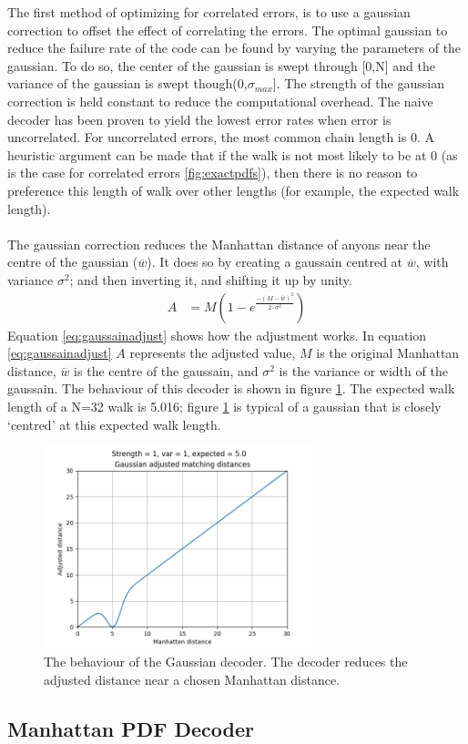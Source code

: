 	The first method of optimizing for correlated errors, is to use a gaussian correction to offset the effect of correlating the errors. The optimal gaussian to reduce the failure rate of the code can be found by varying the parameters of the gaussian. To do so, the center of the gaussian is swept through [0,N] and the variance of the gaussian is swept though(0,$\sigma_{max}$]. The strength of the gaussian correction is held constant to reduce the computational overhead. The naive decoder has been proven to yield the lowest error rates when error is uncorrelated. For uncorrelated errors, the most common chain length is 0. A heuristic argument can be made that if the walk is not most likely to be at 0 (as is the case for correlated errors \ref{fig:exactpdfs}), then there is no reason to preference this length of walk over other lengths (for example, the expected walk length). 
	\\\\
	The gaussian correction reduces the Manhattan distance of anyons near the centre of the gaussian ($\overline{w}$).  It does so by creating a gaussain centred at $\overline{w}$, with variance $\sigma^2$; and then inverting it, and shifting it up by unity. 
	\begin{align}
	A &= M \left( 1 - e^{\frac{-(M-\overline{w})^2}{2\cdot \sigma^2}} \right) 
	\label{eq:gaussainadjust}
	\end{align}
	Equation \ref{eq:gaussainadjust} shows how the adjustment works. In equation \ref{eq:gaussainadjust} $A$ represents the adjusted value, $M$ is the original Manhattan distance, $\overline{w}$ is the centre of the gaussain, and $\sigma^2$ is the variance or width of the gaussain.
	The behaviour of this decoder is shown in figure \ref{fig:gaussiancorrection}. The expected walk length of a N=32 walk is 5.016; figure \ref{fig:gaussiancorrection} is typical of a gaussian that is closely `centred' at this expected walk length.
	\begin{figure}
		\centering
		\includegraphics[width = 0.7\textwidth]{figs/gaussian-20.png}
		\caption{The behaviour of the Gaussian decoder. The decoder reduces the adjusted distance near a chosen Manhattan distance.}
		\label{fig:gaussiancorrection}
	\end{figure}
	\subsection{Manhattan PDF Decoder}
	